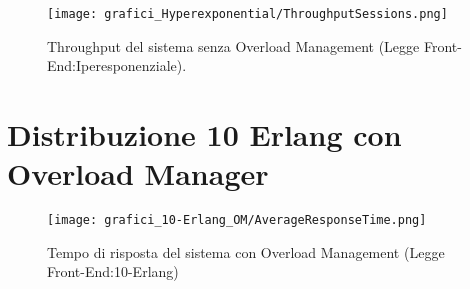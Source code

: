 \begin{figure}[H]
	\begin{center}
	\texttt{[image: grafici\_Hyperexponential/ThroughputSessions.png]}
	\caption[Throughput del sistema senza Overload Management (Legge Front-End:Iperesponenziale)]{Throughput del sistema senza Overload Management (Legge Front-End:Iperesponenziale).}
	\label{fig:exp_res_time}
	\end{center}
\end{figure}
\begin{comment}
\section{Grafici delle autocorrelazioni}
\begin{figure}[H]
	\begin{center}
	\texttt{[image: grafici\_Autocorrelazione/seed625435336.png]}
	\caption[Autocorrelazione per il seed 625435336]{Autocorrelazione per il seed 625435336.}
	\label{fig:exp_res_time}
	\end{center}
\end{figure}
\begin{figure}[H]
	\begin{center}
	\texttt{[image: grafici\_Autocorrelazione/ThroughputSessions.png]}
	\caption[Throughput del sistema senza Overload Management (Legge Front-End:Iperesponenziale)]{Throughput del sistema senza Overload Management (Legge Front-End:Iperesponenziale).}
	\label{fig:exp_res_time}
	\end{center}
\end{figure}

\begin{figure}[H]
	\begin{center}
	\texttt{[image: grafici\_Autocorrelazione/ThroughputSessions.png]}
	\caption[Throughput del sistema senza Overload Management (Legge Front-End:Iperesponenziale)]{Throughput del sistema senza Overload Management (Legge Front-End:Iperesponenziale).}
	\label{fig:exp_res_time}
	\end{center}
\end{figure}
\end{comment}
\section{Distribuzione 10 Erlang con Overload Manager}
\begin{figure}[H]
	\begin{center}
	\texttt{[image: grafici\_10-Erlang\_OM/AverageResponseTime.png]}
	\caption[Tempo di risposta del sistema con Overload Management (Legge Front-End:10-Erlang)]
	{Tempo di risposta del sistema con Overload Management (Legge Front-End:10-Erlang)}
	\label{fig:exp_res_time}
	\end{center}
	\end{figure}

